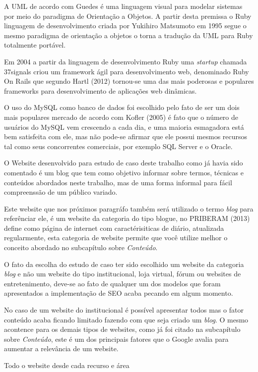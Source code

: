 \documentclass[
	12pt,				%
	openright,			%
	twoside,			%
	a4paper,			%
	english,			%
	french,				%
	spanish,			%
	brazil				%
	]{abntex2}
\begin{document}
A UML de acordo com Guedes é uma linguagem visual para modelar sistemas por meio do paradigma de Orientação a Objetos. A partir desta premissa o Ruby linguagem de desenvolvimento criada por Yukihiro Matsumoto em 1995 segue o mesmo paradigma de orientação a objetos o torna a tradução da UML para Ruby totalmente portável.

Em 2004 	a partir da linguagem de desenvolvimento Ruby uma \textit{startup} chamada 37signals criou um framework ágil  para desenvolvimento web, denominado Ruby On Rails que segundo Hartl (2012) tornou-se uma das mais poderosas e populares frameworks para desenvolvimento de aplicações web dinâmicas.

O uso do MySQL como banco de dados foi escolhido pelo fato de ser um dois mais populares mercado de acordo com Kofler (2005) é fato que o número de usuários do MySQL vem crescendo a cada dia, e uma maioria esmagadora está bem satisfeita com ele, mas não pode-se afirmar que ele possui mesmos recursos tal como seus concorrentes comerciais, por exemplo SQL Server e o Oracle.

O Website desenvolvido para estudo de caso deste trabalho como já havia sido comentado é um blog que tem como objetivo informar sobre termos, técnicas e conteúdos abordados neste trabalho, mas de uma forma informal para fácil compreenssão de um público variado.

Este website que nos próximos paragráfo também será utilizado o termo \textit{blog} para referênciar ele, é um website da categoria do tipo blogue, no PRIBERAM (2013) define como página de internet com caractérisiticas de diário, atualizada regularmente, esta categoria de website permite que você utilize melhor o conceito abordado no subcapítulo sobre \textit{Conteúdo}.

O fato da escolha do estudo de caso ter sido escolhido um website da categoria \textit{blog} e não um website do tipo institucional, loja virtual, fórum ou websites de entretenimento, deve-se ao fato de qualquer um dos modelos que foram apresentados a implementação de SEO acaba pecando em algum momento.

No caso de um website do institucional é possível apresentar todos mas o fator conteúdo acaba ficando limitado fazendo com que seja criado um \textit{blog}. O mesmo acontence para os demais tipos de websites, como já foi citado na subcapítulo sobre \textit{Conteúdo}, este é um dos principais fatores que o Google avalia para aumentar a relevância de um website.

Todo o website desde cada recurso e área 
\end{document}
